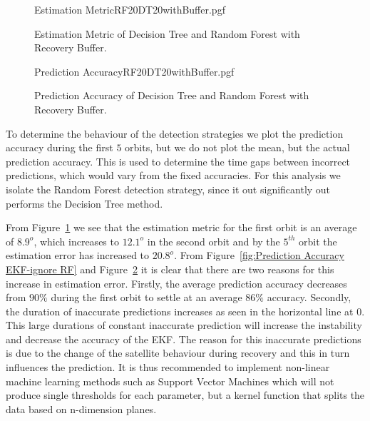 \documentclass[letterpaper, 10 pt, conference]{ieeeconf}  %
\begin{document}
\begin{figure}[!htb]
	\begin{center}
		{Estimation MetricRF20DT20withBuffer.pgf}
	\end{center}
	\caption[Estimation Metric of Decision Tree and Random Forest with Recovery Buffer]{Estimation Metric of Decision Tree and Random Forest with Recovery Buffer.}
	\label{fig:Estimation Accuracy EKF-ignore DT and RF with Recovery Buffer}
\end{figure}

\begin{figure}[!htb]
	\begin{center}
		{Prediction AccuracyRF20DT20withBuffer.pgf}
	\end{center}
	\caption[Prediction Accuracy of Decision Tree and Random Forest with Recovery Buffer]{Prediction Accuracy of Decision Tree and Random Forest with Recovery Buffer.}
	\label{fig:Summary Prediction Accuracy EKF-ignore DT and RF with Recovery Buffer}
\end{figure}

To determine the behaviour of the detection strategies we plot the prediction accuracy during the first $5$ orbits, but we do not plot the mean, but the actual prediction accuracy. This is used to determine the time gaps between incorrect predictions, which would vary from the fixed accuracies. For this analysis we isolate the Random Forest detection strategy, since it out significantly out performs the Decision Tree method.

From Figure~\ref{fig:Estimation Accuracy EKF-ignore DT and RF with Recovery Buffer} we see that the estimation metric for the first orbit is an average of $8.9^o$, which increases to $12.1^o$ in the second orbit and by the $5^{th}$ orbit the estimation error has increased to $20.8^o$. From Figure~\ref{fig:Prediction Accuracy EKF-ignore RF} and Figure~\ref{fig:Summary Prediction Accuracy EKF-ignore DT and RF with Recovery Buffer} it is clear that there are two reasons for this increase in estimation error. Firstly, the average prediction accuracy decreases from $90\%$ during the first orbit to settle at an average $86\%$ accuracy. Secondly, the duration of inaccurate predictions increases as seen in the horizontal line at $0$. This large durations of constant inaccurate prediction will increase the instability and decrease the accuracy of the EKF. The reason for this inaccurate predictions is due to the change of the satellite behaviour during recovery and this in turn influences the prediction. It is thus recommended to implement non-linear machine learning methods such as Support Vector Machines which will not produce single thresholds for each parameter, but a kernel function that splits the data based on n-dimension planes.
\end{document}
